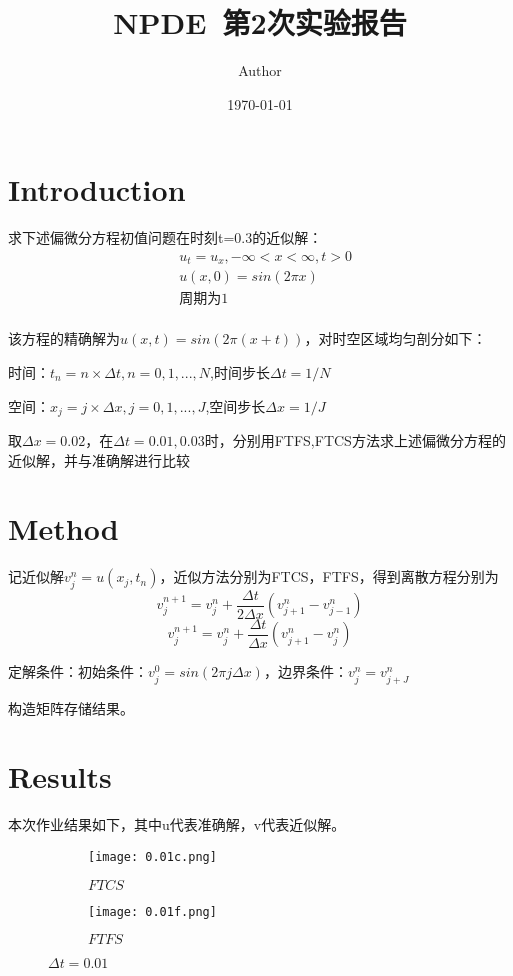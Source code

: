 \documentclass{article}
\title{NPDE~第2次实验报告}
\author{Author}
\date{\today}
\begin{document}
\maketitle

\section{Introduction}

求下述偏微分方程初值问题在时刻t=0.3的近似解：
$$
\begin{aligned}
    &u_t=u_x,-\infty<x<\infty,t>0\\
    &u(x,0)=sin(2\pi x)\\
    &\text{周期为1}\\
\end{aligned}
$$

该方程的精确解为$u(x,t)=sin(2\pi(x+t))$，对时空区域均匀剖分如下：

时间：$t_n=n\times \Delta t,n=0,1,...,N$,时间步长$\Delta t=1/N$

空间：$x_j=j\times \Delta x,j=0,1,...,J$,空间步长$\Delta x=1/J$


取$\Delta x =0.02$，在$\Delta t=0.01,0.03$时，分别用FTFS,FTCS方法求上述偏微分方程的近似解，并与准确解进行比较
\section{Method}

记近似解$v_j^n=u(x_j,t_n)$，近似方法分别为FTCS，FTFS，得到离散方程分别为
$$v_j^{n+1}=v_j^n+\frac{\Delta t}{2\Delta x}(v_{j+1}^n-v_{j-1}^n)$$
$$v_j^{n+1}=v_j^n+\frac{\Delta t}{\Delta x}(v_{j+1}^n-v_{j}^n)$$

定解条件：初始条件：$v_j^0=sin(2\pi j\Delta x)$，边界条件：$v_j^n=v_{j+J}^n$

构造矩阵存储结果。
\section{Results}

本次作业结果如下，其中u代表准确解，v代表近似解。
\begin{figure}[H]
    \centering
    \begin{subfigure}[b]{0.47\textwidth}
        \centering
        \texttt{[image: 0.01c.png]}
        \caption{$FTCS$}
        
    \end{subfigure}
    \begin{subfigure}[b]{0.47\textwidth}
        \centering
        \texttt{[image: 0.01f.png]}
        \caption{$FTFS$}
        
    \end{subfigure}
    \caption{$\Delta t=0.01$}
\end{figure}
\end{document}
